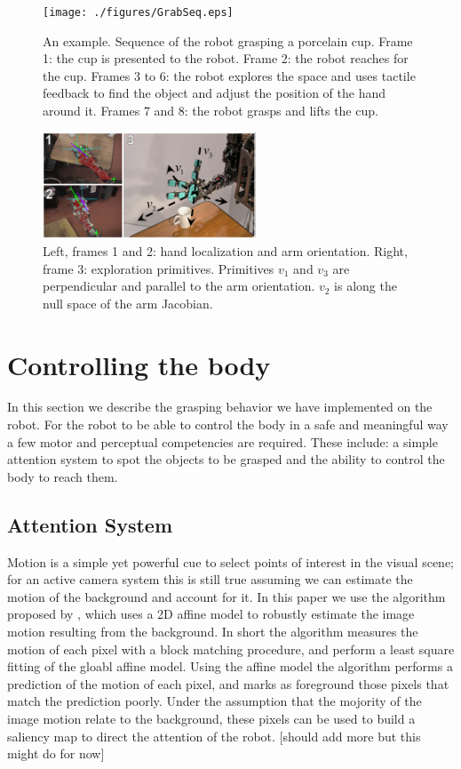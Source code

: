 \begin{figure}[tb]
\centerline{
\texttt{[image: ./figures/GrabSeq.eps]}
} \caption{An example. Sequence of the robot grasping a porcelain
cup. Frame 1: the cup is presented to the robot. Frame 2: the
robot reaches for the cup. Frames 3 to 6:  the robot explores the
space and uses tactile feedback to find the object and adjust the
position of the hand around it. Frames 7 and 8: the robot grasps
and lifts the cup.} \label{fig-sequence}
\end{figure}

\begin{figure}[tb]
  \centerline{
    \includegraphics[width=2.5in, angle=0 ]{./figures/expl-directions.eps}
  }\caption{Left, frames 1 and 2: hand localization and arm 
    orientation. Right, frame 3: exploration primitives. Primitives $v_1$ 
and $v_3$ are perpendicular and parallel to the arm orientation. $v_2$ is 
along the null space of the arm Jacobian.}
\label{fig-expl-directions}
\end{figure}

\section{Controlling the body}
\label{sec:controlling}

In this section we describe the grasping behavior we have implemented
on the robot. For the robot to be able to control the body in a safe
and meaningful way a few motor and perceptual competencies are required.
These include: a simple attention system to spot the objects to be grasped 
and the ability to control the body to reach them.

\subsection{Attention System}
Motion is a simple yet powerful cue to select points of interest in the visual
scene; for an active camera system this is still true assuming we can estimate 
the motion of the background and account for it. In this paper we use the 
algorithm proposed by \cite{kemp-thesis}, which uses a 2D affine model to 
robustly estimate the image motion resulting from the background. In short the 
algorithm measures the motion of each pixel with a block matching procedure, and 
perform a least square fitting of the gloabl affine model. Using the affine model
the algorithm performs a prediction of the motion of each pixel, and marks as 
foreground those pixels that match the prediction poorly. Under the assumption 
that the mojority of the image motion relate to the background, these pixels 
can be used to build a saliency map to direct the attention of the robot. 
[should add more but this might do for now]

